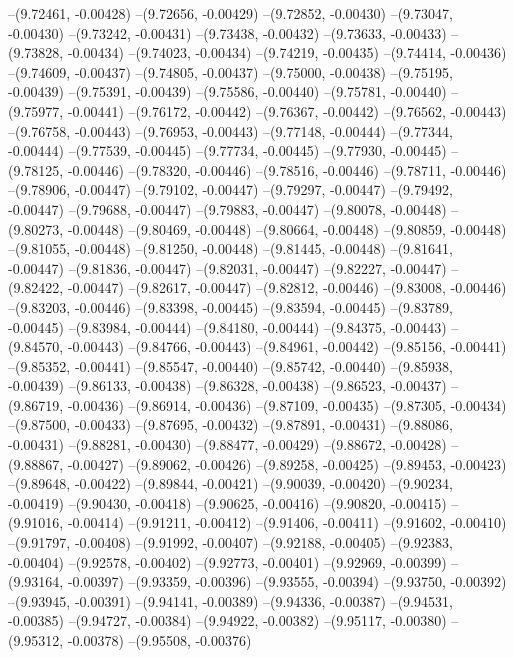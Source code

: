 --(9.72461, -0.00428)
--(9.72656, -0.00429)
--(9.72852, -0.00430)
--(9.73047, -0.00430)
--(9.73242, -0.00431)
--(9.73438, -0.00432)
--(9.73633, -0.00433)
--(9.73828, -0.00434)
--(9.74023, -0.00434)
--(9.74219, -0.00435)
--(9.74414, -0.00436)
--(9.74609, -0.00437)
--(9.74805, -0.00437)
--(9.75000, -0.00438)
--(9.75195, -0.00439)
--(9.75391, -0.00439)
--(9.75586, -0.00440)
--(9.75781, -0.00440)
--(9.75977, -0.00441)
--(9.76172, -0.00442)
--(9.76367, -0.00442)
--(9.76562, -0.00443)
--(9.76758, -0.00443)
--(9.76953, -0.00443)
--(9.77148, -0.00444)
--(9.77344, -0.00444)
--(9.77539, -0.00445)
--(9.77734, -0.00445)
--(9.77930, -0.00445)
--(9.78125, -0.00446)
--(9.78320, -0.00446)
--(9.78516, -0.00446)
--(9.78711, -0.00446)
--(9.78906, -0.00447)
--(9.79102, -0.00447)
--(9.79297, -0.00447)
--(9.79492, -0.00447)
--(9.79688, -0.00447)
--(9.79883, -0.00447)
--(9.80078, -0.00448)
--(9.80273, -0.00448)
--(9.80469, -0.00448)
--(9.80664, -0.00448)
--(9.80859, -0.00448)
--(9.81055, -0.00448)
--(9.81250, -0.00448)
--(9.81445, -0.00448)
--(9.81641, -0.00447)
--(9.81836, -0.00447)
--(9.82031, -0.00447)
--(9.82227, -0.00447)
--(9.82422, -0.00447)
--(9.82617, -0.00447)
--(9.82812, -0.00446)
--(9.83008, -0.00446)
--(9.83203, -0.00446)
--(9.83398, -0.00445)
--(9.83594, -0.00445)
--(9.83789, -0.00445)
--(9.83984, -0.00444)
--(9.84180, -0.00444)
--(9.84375, -0.00443)
--(9.84570, -0.00443)
--(9.84766, -0.00443)
--(9.84961, -0.00442)
--(9.85156, -0.00441)
--(9.85352, -0.00441)
--(9.85547, -0.00440)
--(9.85742, -0.00440)
--(9.85938, -0.00439)
--(9.86133, -0.00438)
--(9.86328, -0.00438)
--(9.86523, -0.00437)
--(9.86719, -0.00436)
--(9.86914, -0.00436)
--(9.87109, -0.00435)
--(9.87305, -0.00434)
--(9.87500, -0.00433)
--(9.87695, -0.00432)
--(9.87891, -0.00431)
--(9.88086, -0.00431)
--(9.88281, -0.00430)
--(9.88477, -0.00429)
--(9.88672, -0.00428)
--(9.88867, -0.00427)
--(9.89062, -0.00426)
--(9.89258, -0.00425)
--(9.89453, -0.00423)
--(9.89648, -0.00422)
--(9.89844, -0.00421)
--(9.90039, -0.00420)
--(9.90234, -0.00419)
--(9.90430, -0.00418)
--(9.90625, -0.00416)
--(9.90820, -0.00415)
--(9.91016, -0.00414)
--(9.91211, -0.00412)
--(9.91406, -0.00411)
--(9.91602, -0.00410)
--(9.91797, -0.00408)
--(9.91992, -0.00407)
--(9.92188, -0.00405)
--(9.92383, -0.00404)
--(9.92578, -0.00402)
--(9.92773, -0.00401)
--(9.92969, -0.00399)
--(9.93164, -0.00397)
--(9.93359, -0.00396)
--(9.93555, -0.00394)
--(9.93750, -0.00392)
--(9.93945, -0.00391)
--(9.94141, -0.00389)
--(9.94336, -0.00387)
--(9.94531, -0.00385)
--(9.94727, -0.00384)
--(9.94922, -0.00382)
--(9.95117, -0.00380)
--(9.95312, -0.00378)
--(9.95508, -0.00376)
